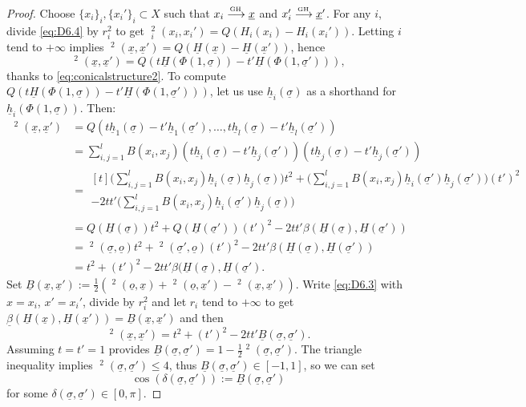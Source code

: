 \documentclass[JEP,XML,SOM,Unicode,published]{cedram}
\def\To#1{\mathchoice{\xrightarrow{\textstyle\kern4pt#1\kern3pt}}{\stackrel{#1}{\longrightarrow}}{}{}}
\newcommand{\sGH}{{\scriptscriptstyle\mathrm{GH}\,}}
\theoremstyle{plain}
\theoremstyle{definition}
\newcommand{\dist}{\mathsf{d}}
\newcommand{\uB}{\underline{B}}
\newcommand{\usigma}{\underline{\sigma}}
\DeclareMathOperator{\udist}{\underline{\dist}}
\newcommand{\uo}{\underline{o}}
\newcommand{\ux}{\underline{x}}
\newcommand{\uH}{\underline{H}}
\newcommand{\ubeta}{\underline{\beta}}
\newcommand{\uh}{\underline{h}}
\begin{document}
\begin{proof}
Choose $\{x_i\}_i, \{x_i'\}_i \subset X$ such that $x_i \To{\sGH} \ux$ and $x_i' \To{\sGH} \ux'$. For any $i$, divide \eqref{eq:D6.4} by $r_i^2$ to get $
\udist_i^2(x_i,x_i') = Q(H_i(x_i)-H_i(x_i'))$.
Letting $i$ tend to $+\infty$ implies $
\udist^2(\ux,\ux') = Q(\uH(\ux)-\uH(\ux'))$, hence
\[
\udist^2(\ux,\ux')
= Q(t \uH(\Phi(1,\usigma)) - t' \uH(\Phi(1,\usigma'))),
\]
thanks to \eqref{eq:conicalstructure2}. To compute $Q(t \uH(\Phi(1,\usigma)) - t' \uH(\Phi(1,\usigma')))$, let us use $\underline{h}_i(\usigma)$ as a shorthand for $\underline{h}_i(\Phi(1,\usigma))$. Then:
\begin{align*}
\udist^2(\ux,\ux') & = Q(t\uh_1(\usigma) - t' \uh_1(\usigma'), \ldots, t\uh_l(\usigma) - t' \uh_l(\usigma')) \nonumber \\
& = \sum_{i,j=1}^l B(x_i,x_j) (t\underline{h}_i(\usigma)-t'\underline{h}_j(\usigma'))(t \underline{h}_j(\usigma)-t'\underline{h}_j(\usigma')) \\
& = \begin{multlined}[t]
\biggl(\sum_{i,j=1}^l B(x_i,x_j) \uh_i(\usigma)\uh_j(\usigma)\biggr) t^2 + \biggl(\sum_{i,j=1}^l B(x_i,x_j) \uh_i(\usigma')\uh_j(\usigma')\biggr) (t')^2\\
 - 2 t t' \biggl(\sum_{i,j=1}^l B(x_i,x_j) \uh_i(\usigma')\uh_j(\usigma)\biggr)
\end{multlined}\\
& = Q(\uH(\usigma)) t^2 + Q(\uH(\usigma')) (t')^2 - 2 t t' \beta(\uH(\usigma),\uH(\usigma'))\\
& = \udist^2(\usigma,\uo)t^2 + \udist^2(\usigma',\uo) (t')^2 - 2 t t' \beta(\uH(\usigma),\uH(\usigma'))\\
& = t^2 + (t')^2 - 2 t t' \beta(\uH(\usigma),\uH(\usigma').
\end{align*}
Set $\uB(\ux,\ux'):=\frac{1}{2}(\udist^2(\uo,\ux)+\udist^2(\uo,\ux')-\udist^2(\ux,\ux'))$. Write \eqref{eq:D6.3} with $x=x_i$, $x'=x_i'$, divide by $r_i^2$ and let $r_i$ tend to $+\infty$ to get $\ubeta(\uH(\ux),\uH(\ux'))=\uB(\ux,\ux')$ and then
\begin{equation}\label{eq:coeur}
\udist^2(\ux,\ux') = t^2 + (t')^2 - 2 t t' \uB(\usigma,\usigma').
\end{equation}
Assuming $t=t'=1$ provides $\uB(\usigma,\usigma')=1-\frac{1}{2}\udist^2(\usigma,\usigma')$. The triangle inequality implies $\udist^2(\usigma,\usigma')\le 4$, thus $\uB(\usigma,\usigma') \in [-1,1]$, so we can set
\[
\cos(\delta(\usigma,\usigma')):=\uB(\usigma,\usigma')
\]
for some $\delta(\usigma,\usigma') \in [0,\pi]$.
\end{proof}
\end{document}
